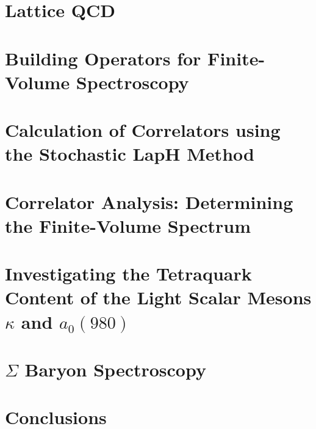 \documentclass[12pt]{report}
\begin{document}
\chapter{Lattice QCD}\label{ch:latticeqcd}


\chapter{Building Operators for Finite-Volume Spectroscopy}\label{ch:operators}


\chapter{Calculation of Correlators using the Stochastic LapH Method}\label{ch:montecarlo}


\chapter{Correlator Analysis: Determining the Finite-Volume Spectrum}\label{ch:analysis}


\chapter{Investigating the Tetraquark Content of the Light Scalar Mesons $\kappa$ and $a_0(980)$}\label{ch:tetraquarks}


\chapter{$\Sigma$ Baryon Spectroscopy}\label{ch:sigmas}


\chapter{Conclusions}\label{ch:conclusions}




\end{document}
